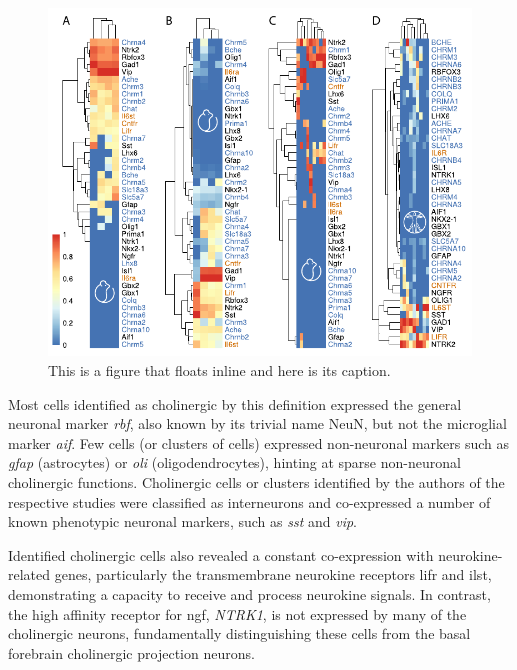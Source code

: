 \begin{figure}
\includegraphics[width=\textwidth]{figures/singlecell}
\caption[Short figure name.]{This is a figure that floats inline and here is its caption.
\label{fig:singlecell}}
\end{figure}

Most cells identified as cholinergic by this definition expressed the general neuronal marker \textit{\acs{rbf}}, also known by its trivial name NeuN, but not the microglial marker \textit{\acs{aif}}. Few cells (or clusters of cells) expressed non-neuronal markers such as \textit{\acs{gfap}} (astrocytes) or \textit{\acs{oli}} (oligodendrocytes), hinting at sparse non-neuronal cholinergic functions. Cholinergic cells or clusters identified by the authors of the respective studies were classified as interneurons and co-expressed a number of known phenotypic neuronal markers, such as \textit{\ac{sst}} and \textit{\ac{vip}}.

Identified cholinergic cells also revealed a constant co-expression with neurokine-related genes, particularly the transmembrane neurokine receptors \ac{lifr} and \ac{ilst}, demonstrating a capacity to receive and process neurokine signals. In contrast, the high affinity receptor for \ac{ngf}, \textit{NTRK1}, is not expressed by many of the cholinergic neurons, fundamentally distinguishing these cells from the basal forebrain cholinergic projection neurons.

